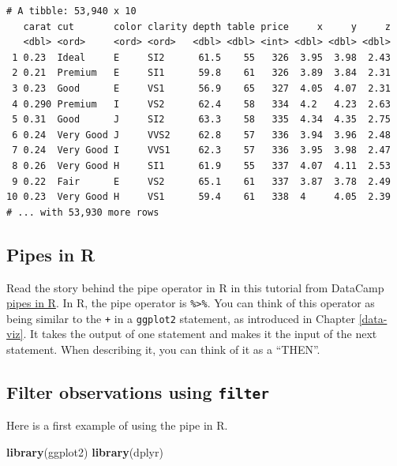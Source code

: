 \documentclass[
]{book}
\newenvironment{Shaded}{\begin{snugshade}}{\end{snugshade}}
\newcommand{\KeywordTok}[1]{\textcolor[rgb]{0.13,0.29,0.53}{\textbf{#1}}}
\newcommand{\NormalTok}[1]{#1}
\begin{document}
\begin{verbatim}
# A tibble: 53,940 x 10
   carat cut       color clarity depth table price     x     y     z
   <dbl> <ord>     <ord> <ord>   <dbl> <dbl> <int> <dbl> <dbl> <dbl>
 1 0.23  Ideal     E     SI2      61.5    55   326  3.95  3.98  2.43
 2 0.21  Premium   E     SI1      59.8    61   326  3.89  3.84  2.31
 3 0.23  Good      E     VS1      56.9    65   327  4.05  4.07  2.31
 4 0.290 Premium   I     VS2      62.4    58   334  4.2   4.23  2.63
 5 0.31  Good      J     SI2      63.3    58   335  4.34  4.35  2.75
 6 0.24  Very Good J     VVS2     62.8    57   336  3.94  3.96  2.48
 7 0.24  Very Good I     VVS1     62.3    57   336  3.95  3.98  2.47
 8 0.26  Very Good H     SI1      61.9    55   337  4.07  4.11  2.53
 9 0.22  Fair      E     VS2      65.1    61   337  3.87  3.78  2.49
10 0.23  Very Good H     VS1      59.4    61   338  4     4.05  2.39
# ... with 53,930 more rows
\end{verbatim}

\hypertarget{pipes-in-r}{%
\subsection{Pipes in R}\label{pipes-in-r}}

Read the story behind the pipe operator in R in this tutorial from DataCamp \href{https://www.datacamp.com/community/tutorials/pipe-r-tutorial}{pipes in R}. In R, the pipe operator is \texttt{\%\textgreater{}\%}. You can think of this operator as being similar to the \texttt{+} in a \texttt{ggplot2} statement, as introduced in Chapter \ref{data-viz}. It takes the output of one statement and makes it the input of the next statement. When describing it, you can think of it as a ``THEN''.

\hypertarget{filter-observations-using-filter}{%
\subsection{\texorpdfstring{Filter observations using \texttt{filter}}{Filter observations using filter}}\label{filter-observations-using-filter}}

Here is a first example of using the pipe in R.

\begin{Shaded}
\begin{Highlighting}[]
\KeywordTok{library}\NormalTok{(ggplot2)}
\KeywordTok{library}\NormalTok{(dplyr)}
\end{Highlighting}
\end{Shaded}
\end{document}
